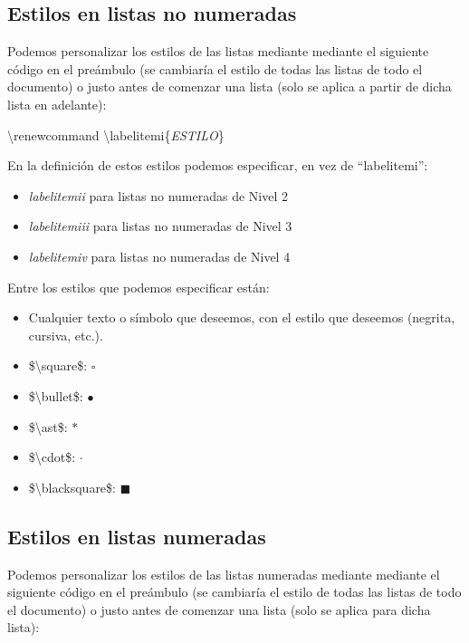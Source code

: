 \documentclass[12pt]{book} %
\begin{document}
\subsection{Estilos en listas no numeradas}

Podemos personalizar los estilos de las listas mediante mediante el siguiente código en el preámbulo (se cambiaría el estilo de todas las listas de todo el documento) o justo antes de comenzar una lista (solo se aplica a partir de dicha lista en adelante):

\textbackslash renewcommand \textbackslash labelitemi\{\emph{ESTILO}\}

En la definición de estos estilos podemos especificar, en vez de ``labelitemi'':

\begin{itemize}
	\item \emph{labelitemii} para listas no numeradas de Nivel 2
	\item \emph{labelitemiii} para listas no numeradas de Nivel 3
	\item\emph{labelitemiv} para listas no numeradas de Nivel 4
\end{itemize}

Entre los estilos que podemos especificar están:

\renewcommand\labelitemi{$\cdot$}
\begin{itemize}
	\item Cualquier texto o símbolo que deseemos, con el estilo que deseemos (negrita, cursiva, etc.).
	\item \$\textbackslash square\$: $\square$
	\item \$\textbackslash bullet\$: $\bullet$
	\item \$\textbackslash ast\$: $\ast$
	\item \$\textbackslash cdot\$: $\cdot$
	\item \$\textbackslash blacksquare\$: $\blacksquare$
\end{itemize}

\renewcommand\labelitemi{\tiny$\blacksquare$}

\subsection{Estilos en listas numeradas}

Podemos personalizar los estilos de las listas numeradas mediante mediante el siguiente código en el preámbulo (se cambiaría el estilo de todas las listas de todo el documento) o justo antes de comenzar una lista (solo se aplica para dicha lista):
\end{document}
